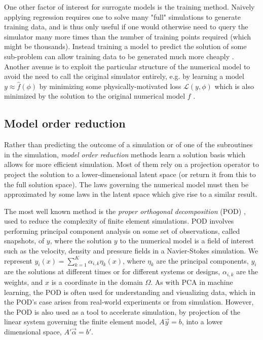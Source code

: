 \documentclass{puthesis}
\begin{document}
One other factor of interest for surrogate models is the training method.
Naively applying regression requires one to solve many "full" simulations
to generate training data, and is thus only useful if one would otherwise need
to query the simulator many more times than the number of training points required
(which might be thousands).
Instead training a model to predict the solution of some sub-problem can allow
training data to be generated much more cheaply
\citep{tompson2017accelerating,beatson2020learning}.
Another avenue is to exploit the particular structure of the numerical model to avoid
the need to call the original simulator entirely, e.g. by learning a model
$y \approx \hat{f}(\phi)$ by minimizing some physically-motivated loss
$\mathcal{L}(y, \phi)$ which is also minimized by the solution to the original
numerical model $f$ \citep{xue2020amortized}.

\subsection{Model order reduction}
Rather than predicting the outcome of a simulation or of one of the subroutines in the
simulation, \emph{model order reduction} methods learn a solution basis which allows for
more efficient simulation.
Most of them rely on a projection operator to project the solution to a
lower-dimensional latent space (or return it from this to the full solution space).
The laws governing the numerical model must then be approximated by some laws in the
latent space which give rise to a similar result.

The most well known method is the \emph{proper orthogonal decomposition} (POD) \citep{chatterjee2000introduction}, used to
reduce the complexity of finite element simulations.
POD involves performing principal component analysis on some set of observations,
called snapshots, of $y$, where the solution $y$ to the numerical model is a field of
interest such as the velocity, density and pressure fields in a Navier-Stokes simulation.
We represent $y_i(x) = \sum_{k=1}^K \alpha_{i,k} \eta_k(x)$, where $\eta_k$ are the
principal components, $y_i$ are the solutions at different times or for different
systems or designs, $\alpha_{i, k}$ are the weights, and $x$ is a coordinate in the
domain $\Omega$.
As with PCA in machine learning, the POD is often used for understanding and visualizing
data, which in the POD's case arises from real-world experiments or from simulation.
However, the POD is also used as a tool to accelerate simulation, by projection of the
linear system governing the finite element model, $A\vec{y} = b$, into a lower
dimensional space, $A' \vec{\alpha} = b'$.
\end{document}
